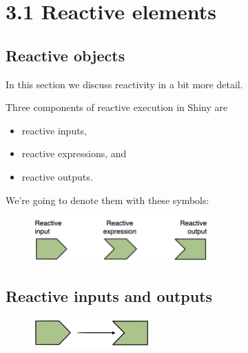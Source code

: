 \documentclass[
  letterpaper,
  DIV=11,
  numbers=noendperiod]{scrreprt}
\providecommand{\tightlist}{%
  \setlength{\itemsep}{0pt}\setlength{\parskip}{0pt}}
\begin{document}
\hypertarget{reactive-elements}{%
\section{3.1 Reactive elements}\label{reactive-elements}}

\hypertarget{reactive-objects}{%
\subsection{Reactive objects}\label{reactive-objects}}

In this section we discuss reactivity in a bit more detail.

Three components of reactive execution in Shiny are

\begin{itemize}
\tightlist
\item
  reactive inputs,
\item
  reactive expressions, and
\item
  reactive outputs.
\end{itemize}

We're going to denote them with these symbols:

\begin{figure}

{\centering \includegraphics[width=0.6\textwidth,height=\textheight]{./images/input-expression-output.png}

}

\end{figure}

\hypertarget{reactive-inputs-and-outputs}{%
\subsection{Reactive inputs and
outputs}\label{reactive-inputs-and-outputs}}

\begin{figure}

{\centering \includegraphics[width=0.4\textwidth,height=\textheight]{./images/input-output.png}

}

\end{figure}
\end{document}
